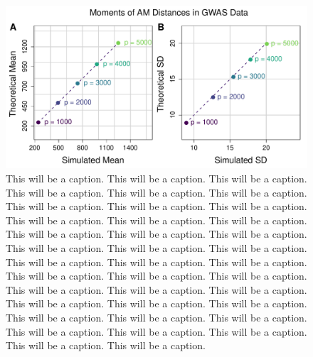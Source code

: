 \documentclass[10pt,letterpaper]{article}\usepackage[]{graphicx}\usepackage[]{color}
\begin{document}
\begin{figure}[H]
	\includegraphics[width=\textwidth]{compared_moments_gwas_am.pdf}
	\caption{This will be a caption. This will be a caption. This will be a caption. This will be a caption. This will be a caption. This will be a caption. This will be a caption. This will be a caption. This will be a caption. This will be a caption. This will be a caption. This will be a caption. This will be a caption. This will be a caption. This will be a caption. This will be a caption. This will be a caption. This will be a caption. This will be a caption. This will be a caption. This will be a caption. This will be a caption. This will be a caption. This will be a caption. This will be a caption. This will be a caption. This will be a caption. This will be a caption. This will be a caption. This will be a caption. This will be a caption. This will be a caption. This will be a caption. This will be a caption. This will be a caption. This will be a caption. This will be a caption. This will be a caption.}
\end{figure}
\end{document}
